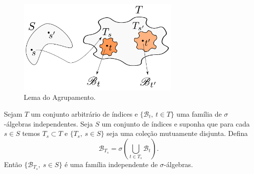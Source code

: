 \begin{center}
\begin{figure}[!htb]
\centering
\includegraphics[width=0.7\textwidth]{Figuras/figura-agrupamento-va-idenpendentes.pdf}
\caption{Lema do Agrupamento.}
\label{Rotulo}
\end{figure}
\end{center}


\begin{lema}
Sejam $T$ um conjunto arbitrário de índices e 
$\{\mathscr{B}_{t},\ t\in T\}$ uma família de 
$\sigma$-álgebras independentes. Seja $S$ 
um conjunto de índices e suponha que 
para cada $s\in S$ temos $T_s\subset T$
e $\{T_s,\ s\in S\}$ seja uma coleção mutuamente disjunta.
Defina 
	\[
		\mathscr{B}_{T_s} 
		=
		\sigma\left(
			\bigcup_{t\in T_s}\mathscr{B}_{t}
		\right).
	\]
Então $\{\mathscr{B}_{T_s},\ s\in S\}$ é uma família 
independente de $\sigma$-álgebras.
\end{lema}




